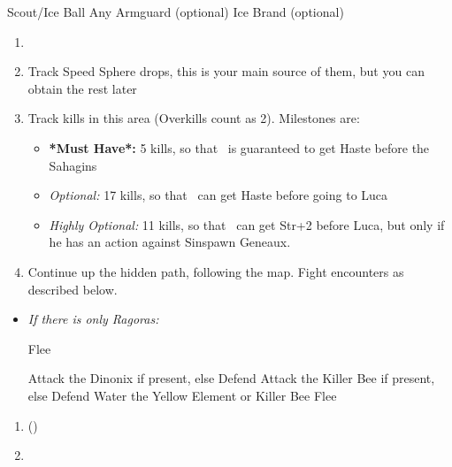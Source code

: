 \begin{equip}
    \begin{itemize}
        \wakkaf Scout/Ice Ball
        \wakkaf Any Armguard (optional)
        \tidusf Ice Brand (optional)
    \end{itemize}
\end{equip}
\begin{enumerate}[resume]
    \item \formation{\tidus}{\wakka}{\lulu}
    \item Track Speed Sphere drops, this is your main source of them, but you can obtain the rest later
    \item Track kills in this area (Overkills count as 2). Milestones are:
    \begin{itemize}
        \item \textbf{*Must Have*:} 5 kills, so that \tidus\ is guaranteed to get Haste before the Sahagins
        \item \textit{Optional:} 17 kills, so that \tidus\ can get Haste before going to Luca
        \item \textit{Highly Optional:} 11 kills, so that \wakka\ can get Str+2 before Luca, but only if he has an action against Sinspawn Geneaux.
    \end{itemize}
    \item Continue up the hidden path, following the map. Fight encounters as described below.
\end{enumerate}
\begin{encounters}
    \begin{itemize}
        \item \textit{If there is only Ragoras:}
        \begin{itemize}
            \tidusf Flee
        \end{itemize}
        \tidusf Attack the Dinonix if present, else Defend
        \wakkaf Attack the Killer Bee if present, else Defend
        \luluf Water the Yellow Element or Killer Bee
        \tidusf Flee
    \end{itemize}
\end{encounters}
\begin{enumerate}[resume]
    \item \formation{\tidus}{\yuna}{\lulu} (\swap{\yuna}{\wakka})
    \item \save
\end{enumerate}
